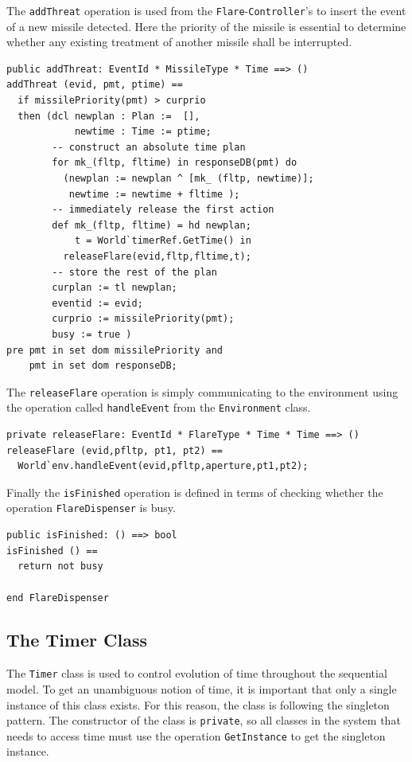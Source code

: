 \documentclass{overturerepchap}
\begin{document}
The \texttt{addThreat} operation is used from the
\texttt{Flare}-\texttt{Controller}'s  
to insert the event of a new missile detected. Here the priority of the
missile is essential to determine whether any existing treatment of another
missile shall be interrupted.

\begin{lstlisting}
public addThreat: EventId * MissileType * Time ==> ()
addThreat (evid, pmt, ptime) ==
  if missilePriority(pmt) > curprio
  then (dcl newplan : Plan :=  [],
            newtime : Time := ptime;
        -- construct an absolute time plan
        for mk_(fltp, fltime) in responseDB(pmt) do
          (newplan := newplan ^ [mk_ (fltp, newtime)];
           newtime := newtime + fltime );
        -- immediately release the first action
        def mk_(fltp, fltime) = hd newplan;
            t = World`timerRef.GetTime() in
          releaseFlare(evid,fltp,fltime,t);
        -- store the rest of the plan
        curplan := tl newplan;
        eventid := evid;
        curprio := missilePriority(pmt);
        busy := true )
pre pmt in set dom missilePriority and
    pmt in set dom responseDB;
\end{lstlisting}

The \texttt{releaseFlare} operation is simply communicating to the 
environment using the operation called \texttt{handleEvent} from the \texttt{Environment} 
class.

\begin{lstlisting}
private releaseFlare: EventId * FlareType * Time * Time ==> ()
releaseFlare (evid,pfltp, pt1, pt2) == 
  World`env.handleEvent(evid,pfltp,aperture,pt1,pt2);
\end{lstlisting}

Finally the \texttt{isFinished} operation is defined in terms of checking
whether the operation \texttt{FlareDispenser} is busy.

\begin{lstlisting}
public isFinished: () ==> bool
isFinished () == 
  return not busy

end FlareDispenser
\end{lstlisting}

\subsection{The Timer Class}\label{sec:timerclass}

The \texttt{Timer} class is used to control evolution of time
throughout the sequential model. To get an unambiguous notion of time, it is important that only a single instance of this class exists. For this reason, the class is following the singleton pattern. The constructor of the class is \texttt{private}, so all classes in the system that needs to access time must use the operation \texttt{GetInstance} to get the singleton instance.
\end{document}

